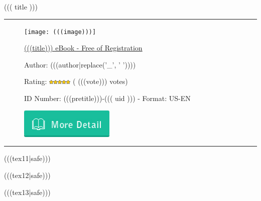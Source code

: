 \documentclass{article}
\newcommand{\garis}{\rule{\linewidth}{0.5mm}}
\begin{document}
{\color{blue}\noindent\huge{((( title )))}}

\noindent\garis


\begin{figure}[!htb]
    \begin{minipage}{.3\textwidth}
        \texttt{[image: (((image)))]}
    \end{minipage}%
    \begin{minipage}{0.7\textwidth}


      \href{http://(((domain)))/download/(((title|replace(' ', '-')))).pdf}{(((title))) eBook - Free of Registration}

      \vspace{12pt}

      Author: (((author|replace('_', ' '))))

      \vspace{12pt}

      Rating: \includegraphics[width=0.1\textwidth]{rating.png} ( (((vote))) votes)

      \vspace{12pt}

      ID Number: (((pretitle)))-((( uid ))) - Format: US-EN

      \vspace{12pt}

      \href{http://(((domain)))/download/(((title|replace(' ', '-')))).pdf}{\includegraphics[width=0.4\textwidth]{button.jpg}}

    \end{minipage}
\end{figure}

\noindent\garis

\vspace{12pt}

(((tex11|safe)))

(((tex12|safe)))

(((tex13|safe)))

\vspace{24pt}
\end{document}
